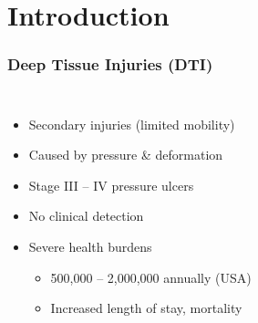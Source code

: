 \documentclass{beamer}
\begin{document}
	\section{Introduction}
		\begin{frame}
			\frametitle{Deep Tissue Injuries (DTI)}
			\begin{columns}[c]
				\begin{itemize}
					\item Secondary injuries (limited mobility)
					\item Caused by pressure \& deformation
					\item Stage III -- IV pressure ulcers
					\item No clinical detection
					\item Severe health burdens \cite{russo08}
					\begin{itemize}
						\item 500,000 -- 2,000,000 annually (USA)
						\item Increased length of stay, mortality
					\end{itemize}
				\end{itemize}


\end{columns}
\end{frame}
\end{document}
